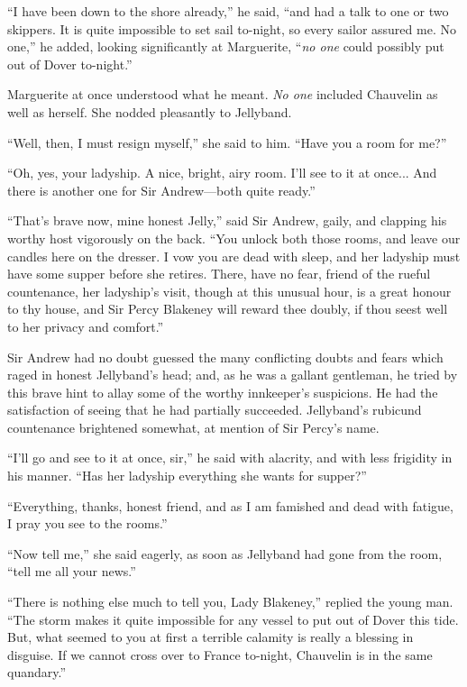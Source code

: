 \enquote{I have been down to the shore already,} he said, \enquote{and had a talk to one or two skippers. It is quite impossible to set sail to-night, so every sailor assured me. No one,} he added, looking significantly at Marguerite, \enquote{\textit{no one} could possibly put out of Dover to-night.}

Marguerite at once understood what he meant. \textit{No one} included Chauvelin as well as herself. She nodded pleasantly to Jellyband.

\enquote{Well, then, I must resign myself,} she said to him. \enquote{Have you a room for me?}

\enquote{Oh, yes, your ladyship. A nice, bright, airy room. I'll see to it at once... And there is another one for Sir Andrew---both quite ready.}

\enquote{That's brave now, mine honest Jelly,} said Sir Andrew, gaily, and clapping his worthy host vigorously on the back. \enquote{You unlock both those rooms, and leave our candles here on the dresser. I vow you are dead with sleep, and her ladyship must have some supper before she retires. There, have no fear, friend of the rueful countenance, her ladyship's visit, though at this unusual hour, is a great honour to thy house, and Sir Percy Blakeney will reward thee doubly, if thou seest well to her privacy and comfort.}

Sir Andrew had no doubt guessed the many conflicting doubts and fears which raged in honest Jellyband's head; and, as he was a gallant gentleman, he tried by this brave hint to allay some of the worthy innkeeper's suspicions. He had the satisfaction of seeing that he had partially succeeded. Jellyband's rubicund countenance brightened somewhat, at mention of Sir Percy's name.

\enquote{I'll go and see to it at once, sir,} he said with alacrity, and with less frigidity in his manner. \enquote{Has her ladyship everything she wants for supper?}

\enquote{Everything, thanks, honest friend, and as I am famished and dead with fatigue, I pray you see to the rooms.}

\enquote{Now tell me,} she said eagerly, as soon as Jellyband had gone from the room, \enquote{tell me all your news.}

\enquote{There is nothing else much to tell you, Lady Blakeney,} replied the young man. \enquote{The storm makes it quite impossible for any vessel to put out of Dover this tide. But, what seemed to you at first a terrible calamity is really a blessing in disguise. If we cannot cross over to France to-night, Chauvelin is in the same quandary.}

